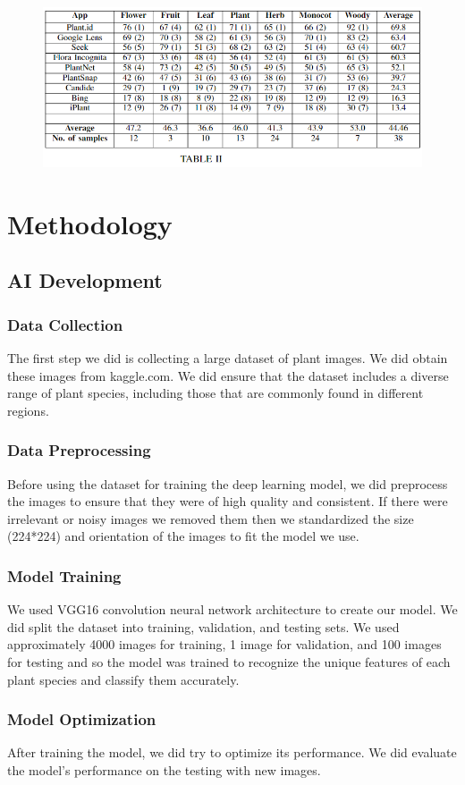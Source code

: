 \documentclass[conference]{IEEEtran}
\begin{document}
\begin{figure}[H]
\centerline{\includegraphics[width=0.48 \textwidth]{images/table2.png}}
\end{figure}





\section{Methodology}

 \subsection{AI Development}
    \subsubsection{Data Collection}The first step we did is collecting a large dataset of plant images. We did obtain these images from kaggle.com. We did ensure that the dataset includes a diverse range of plant species, including those that are commonly found in different regions.
    \subsubsection{Data Preprocessing}Before using the dataset for training the deep learning model, we did preprocess the images to ensure that they were of high quality and consistent. If there were irrelevant or noisy images we removed them then we standardized the size (224*224) and orientation of the images to fit the model we use.
    \subsubsection{Model Training}We used VGG16 convolution neural network architecture \cite{FlowerImageClassification} to create our model. We did split the dataset into training, validation, and testing sets. We used approximately 4000 images for training, 1 image for validation, and 100 images for testing and so the model was trained to recognize the unique features of each plant species and classify them accurately.
    \subsubsection{Model Optimization}After training the model, we did try to optimize its performance. We did evaluate the model's performance on the testing with new images.
\end{document}
